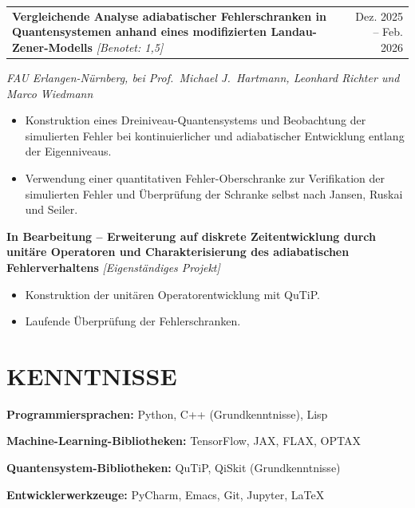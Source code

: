 \documentclass[11pt, a4paper]{article}
\makeatletter
\newcommand{\project}[2]{%
  \noindent\textbf{#1} \textit{[#2]}%
  \vspace{-1pt}
}
\newcommand{\projectdate}[3]{%
  \noindent
  \begin{tabularx}{\linewidth}{@{}X r@{}}
    \textbf{#1} \textit{[#2]} & \small #3
  \end{tabularx}%
  \vspace{1pt}
}
\newenvironment{cvlist}{%
  \begin{itemize}[leftmargin=1.2em, itemsep=-1pt, parsep=1pt, topsep=-1pt]
}{%
  \end{itemize}
}
\newcommand{\skillrow}[2]{%
  \noindent\textbf{#1:} #2\par\vspace{0pt}
}
\makeatother
\begin{document}
\projectdate{Vergleichende Analyse adiabatischer Fehlerschranken in Quantensystemen anhand eines modifizierten Landau-Zener-Modells}
            {Benotet: 1{,}5}
            {Dez. 2025 -- Feb. 2026}
\vspace{0pt}
\noindent\textit{FAU Erlangen-Nürnberg, bei Prof.\ Michael J.\ Hartmann, Leonhard Richter und Marco Wiedmann}
\begin{cvlist}
  \item Konstruktion eines Dreiniveau-Quantensystems und Beobachtung der simulierten
        Fehler bei kontinuierlicher und adiabatischer Entwicklung entlang der Eigenniveaus.
  \item Verwendung einer quantitativen Fehler-Oberschranke zur Verifikation der simulierten
        Fehler und Überprüfung der Schranke selbst nach Jansen, Ruskai und Seiler.
\end{cvlist}

\vspace{0pt}

\project{In Bearbeitung -- Erweiterung auf diskrete Zeitentwicklung durch unitäre Operatoren und Charakterisierung des adiabatischen Fehlerverhaltens}{Eigenständiges Projekt}
\begin{cvlist}
  \item Konstruktion der unitären Operatorentwicklung mit QuTiP.
  \item Laufende Überprüfung der Fehlerschranken.
\end{cvlist}

\vspace{7pt}

\newcommand{\skillgap}{-4pt}   %
\section{KENNTNISSE}
\vspace{0pt}   %
\skillrow{Programmiersprachen}{Python, C++ (Grundkenntnisse), Lisp}\vspace{\skillgap}
\skillrow{Machine-Learning-Bibliotheken}{TensorFlow, JAX, FLAX, OPTAX}\vspace{\skillgap}
\skillrow{Quantensystem-Bibliotheken}{QuTiP, QiSkit (Grundkenntnisse)}\vspace{\skillgap}
\skillrow{Entwicklerwerkzeuge}{PyCharm, Emacs, Git, Jupyter, \LaTeX}
\end{document}
